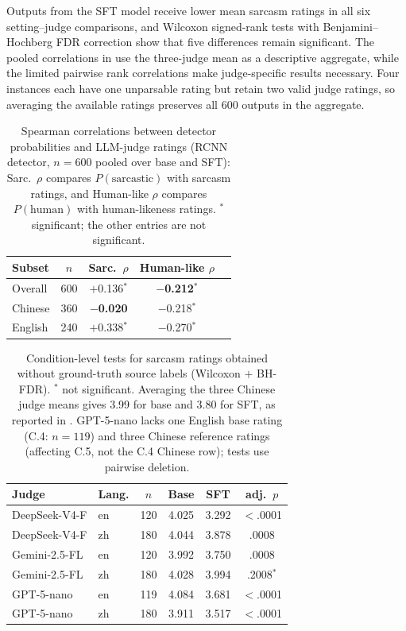 Outputs from the SFT model receive lower mean sarcasm ratings in all six setting--judge comparisons, and Wilcoxon signed-rank tests with Benjamini--Hochberg FDR correction \citep{benjamini1995fdr} show that five differences remain significant. The pooled correlations in  use the three-judge mean as a descriptive aggregate, while the limited pairwise rank correlations make judge-specific results necessary. Four instances each have one unparsable rating but retain two valid judge ratings, so averaging the available ratings preserves all 600 outputs in the aggregate.

\begin{table}[h]
  \centering
  \small
  \begin{tabular}{@{}lcccc@{}}
    \toprule
    \textbf{Subset} & \textbf{$n$} & \textbf{Sarc.\ $\rho$} & \textbf{Human-like $\rho$} \\
    \midrule
    Overall & 600 & $+$0.136$^{*}$ & \textbf{$-$0.212}$^{*}$ \\
    Chinese & 360 & \textbf{$-$0.020} & $-$0.218$^{*}$ \\
    English & 240 & $+$0.338$^{*}$ & $-$0.270$^{*}$ \\
    \bottomrule
  \end{tabular}
  \caption{Spearman correlations between detector probabilities and LLM-judge ratings (RCNN detector, $n = 600$ pooled over base and SFT): Sarc.\ $\rho$ compares $P(\text{sarcastic})$ with sarcasm ratings, and Human-like $\rho$ compares $P(\text{human})$ with human-likeness ratings. $^{*}$ significant; the other entries are not significant.}
  \label{tab:correlation}
\end{table}

\begin{table}[h]
  \centering
  \footnotesize
  \setlength{\tabcolsep}{3pt}
  \begin{tabular}{@{}llcccc@{}}
    \toprule
    \textbf{Judge} & \textbf{Lang.} & \textbf{$n$} & \textbf{Base} & \textbf{SFT} & \textbf{adj.\ $p$} \\
    \midrule
    DeepSeek-V4-F & en & 120 & 4.025 & 3.292 & $<$.0001 \\
    DeepSeek-V4-F & zh & 180 & 4.044 & 3.878 & .0008 \\
    Gemini-2.5-FL & en & 120 & 3.992 & 3.750 & .0008 \\
    Gemini-2.5-FL & zh & 180 & 4.028 & 3.994 & .2008$^{\ast}$ \\
    GPT-5-nano & en & 119 & 4.084 & 3.681 & $<$.0001 \\
    GPT-5-nano & zh & 180 & 3.911 & 3.517 & $<$.0001 \\
    \bottomrule
  \end{tabular}
  \caption{Condition-level tests for sarcasm ratings obtained without ground-truth source labels (Wilcoxon $+$ BH-FDR). $^{\ast}$ not significant. Averaging the three Chinese judge means gives 3.99 for base and 3.80 for SFT, as reported in . GPT-5-nano lacks one English base rating (C.4: $n=119$) and three Chinese reference ratings (affecting C.5, not the C.4 Chinese row); tests use pairwise deletion.}
  \label{tab:group-tests}
\end{table}

